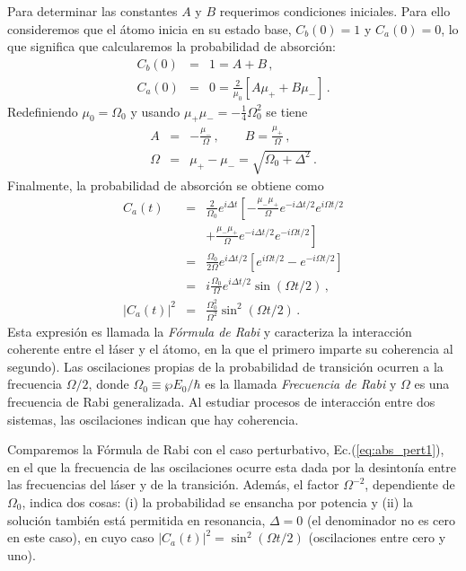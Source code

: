 \documentclass[twocolumn,aps,eqsecnum]{revtex4}
\begin{document}
Para determinar las constantes $A$ y $B$ requerimos condiciones iniciales. 
Para ello consideremos que el \'atomo inicia en su estado base, $C_b(0) =1$ 
y $C_a (0) =0$, lo que significa que calcularemos la probabilidad de absorci\'on:  
%
\begin{eqnarray*} 
C_b (0) &=& 1 = A + B   \,, 	\\  
C_a (0) &=& 0 = \frac{2}{\mu_0} \left[ A \mu_+  + B \mu_-  \right] \,. 	 
\end{eqnarray*}
Redefiniendo $\mu_0 = \Omega_0$ y usando 
$\mu_+ \mu_- = - \frac{1}{4} \Omega_0^2$ se tiene 
%
\begin{eqnarray} 
A &=& - \frac{\mu_-}{\Omega} \,, 	\qquad B = \frac{\mu_+}{\Omega} \,, 
	\nonumber \\ 
\Omega &=& \mu_+ - \mu_-    = \sqrt{\Omega_0 +\Delta^2}  \,. 
\end{eqnarray}
Finalmente, la probabilidad de absorci\'on se obtiene como 
%
\begin{eqnarray} 
C_a (t) &=& \frac{2}{\Omega_0} e^{i \Delta t} 
	\left[ - \frac{\mu_- \mu_+}{\Omega}  e^{-i \Delta t/2}  e^{i \Omega t/2} 
	\right. 	\nonumber \\ 
	&& \left. + \frac{\mu_- \mu_+}{\Omega}  e^{-i \Delta t/2}  e^{-i \Omega t/2}
	 \right]  	\nonumber \\ 
&=& \frac{\Omega_0}{2 \Omega} e^{i \Delta t/2} 
	\left[ e^{i \Omega t/2} - e^{-i \Omega t/2} \right] 	\nonumber \\ 
&=& i \frac{\Omega_0}{\Omega} e^{i \Delta t/2}  \sin{(\Omega t/2)} \,, 
	\nonumber \\
|C_a (t)|^2 &=& \frac{\Omega_0^2}{\Omega^2} \sin^2{(\Omega t/2)}  \,. 
\end{eqnarray}
Esta expresi\'on es llamada la \textit{F\'ormula de Rabi} y caracteriza la 
interacci\'on coherente entre el \l\'aser y el \'atomo, en la que el primero 
imparte su coherencia al segundo). Las oscilaciones propias de la 
probabilidad de transici\'on ocurren a la frecuencia $\Omega/2$, donde 
$\Omega_0 \equiv \wp E_0 /\hbar$ es la llamada \textit{Frecuencia de Rabi} 
y $\Omega$ es una frecuencia de Rabi generalizada. Al estudiar procesos 
de interacci\'on entre dos sistemas, las oscilaciones indican que hay 
coherencia. 

Comparemos la F\'ormula de Rabi con el caso perturbativo, 
Ec.(\ref{eq:abs_pert1}), en el que la frecuencia de las oscilaciones ocurre esta 
dada por la desinton\'ia entre las frecuencias del l\'aser y de la transici\'on. 
Adem\'as, el factor $\Omega^{-2}$, dependiente de $\Omega_0$, indica dos 
cosas: (i) la probabilidad se ensancha por potencia y (ii) la soluci\'on tambi\'en 
est\'a permitida en resonancia, $\Delta =0$ (el denominador no es cero en 
este caso), en cuyo caso $|C_a (t)|^2 = \sin^2{(\Omega t/2)}$ (oscilaciones 
entre cero y uno). 
\end{document}
